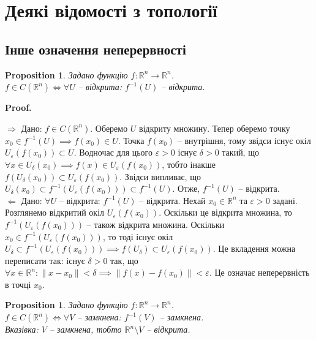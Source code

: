 \documentclass[a4paper, 10pt]{article}
\makeatletter
\def\qed{$\blacksquare$}
\def\rightproof{$\boxed{\Rightarrow}$ }
\def\leftproof{$\boxed{\Leftarrow}$ }
\theoremstyle{theoremdd}
\theoremstyle{theoremdd}
\theoremstyle{theoremdd}
\theoremstyle{theoremdd}
\theoremstyle{theoremdd}
\newtheorem{proposition}[theorem]{Proposition}
\theoremstyle{theoremdd}
\theoremstyle{theoremdd}
\theoremstyle{theoremdd}
\renewenvironment{proof}[1][Proof.\\]{\par
\pushQED{\hfill \qed}%
\normalfont \topsep6\p@\@plus6\p@\relax
\trivlist
\item\relax
{\bfseries
#1\@addpunct{.}}\hspace\labelsep\ignorespaces
}{%
\popQED\endtrivlist\@endpefalse
}
\makeatother
\begin{document}
%
\tableofcontents
\newpage

\iffalse %
\section{Деякі відомості з топології}
\subsection{Інше означення неперервності}
\begin{proposition}
Задано функцію $f \colon \mathbb{R}^n \to \mathbb{R}^n$.\\
$f \in C(\mathbb{R}^n) \iff \forall U$ -- відкрита: $f^{-1}(U)$ -- відкрита.
\end{proposition}

\begin{proof}
\rightproof Дано: $f \in C(\mathbb{R}^n)$. Оберемо $U$ відкриту множину. Тепер оберемо точку $x_0 \in f^{-1}(U) \implies f(x_0) \in U$. Точка $f(x_0)$ -- внутрішня, тому звідси існує окіл $U_\varepsilon(f(x_0)) \subset U$. Водночас для цього $\varepsilon > 0$ існує $\delta > 0$ такий, що $\forall x \in U_\delta(x_0) \implies f(x) \in U_\varepsilon(f(x_0))$, тобто інакше $f(U_\delta(x_0)) \subset U_\varepsilon(f(x_0))$. Звідси випливає, що $U_\delta(x_0) \subset f^{-1}(U_\varepsilon (f(x_0))) \subset f^{-1}(U)$. Отже, $f^{-1}(U)$ -- відкрита.
\bigskip \\
\leftproof Дано: $\forall U$ -- відкрита: $f^{-1}(U)$ -- відкрита. Нехай $x_0 \in \mathbb{R}^n$ та $\varepsilon > 0$ задані. Розглянемо відкритий окіл $U_\varepsilon(f(x_0))$. Оскільки це відкрита множина, то $f^{-1}(U_\varepsilon(f(x_0)))$ -- також відкрита множина. Оскільки $x_0 \in f^{-1}(U_\varepsilon(f(x_0)))$, то тоді існує окіл $U_\delta \subset f^{-1}(U_\varepsilon(f(x_0))) \implies f(U_\delta) \subset U_\varepsilon(f(x_0))$. Це вкладення можна переписати так: існує $\delta > 0$ так, що $\forall x \in \mathbb{R}^n: \|x - x_0 \| < \delta \implies \|f(x) - f(x_0)\| < \varepsilon$. Це означає неперервність в точці $x_0$.
\end{proof}

\begin{proposition}
Задано функцію $f \colon \mathbb{R}^n \to \mathbb{R}^n$.\\
$f \in C(\mathbb{R}^n) \iff \forall V$ -- замкнена: $f^{-1}(V)$ -- замкнена.\\
\textit{Вказівка: $V$ -- замкнена, тобто $\mathbb{R}^n \setminus V$ -- відкрита.}
\end{proposition}
\end{document}
